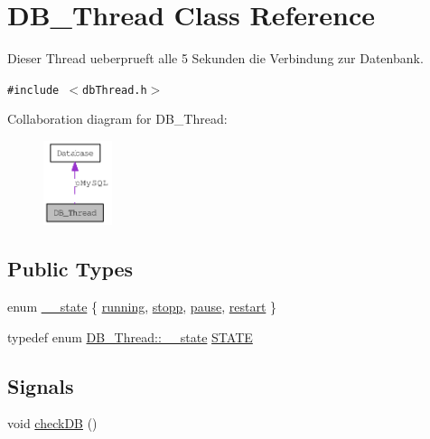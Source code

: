 \hypertarget{class_d_b___thread}{
\section{DB\_\-Thread Class Reference}
\label{class_d_b___thread}
}
Dieser Thread ueberprueft alle 5 Sekunden die Verbindung zur Datenbank.  


{\tt \#include $<$dbThread.h$>$}

Collaboration diagram for DB\_\-Thread:\nopagebreak
\begin{figure}[H]
\begin{center}
\leavevmode
\includegraphics[width=57pt]{class_d_b___thread__coll__graph}
\end{center}
\end{figure}
\subsection*{Public Types}
\begin{CompactItemize}
\item 
enum \hyperlink{class_d_b___thread_056b06b7057fe2d2c90640629908d067}{\_\-\_\-state} \{ \hyperlink{class_d_b___thread_056b06b7057fe2d2c90640629908d067e3fcc0be212969d602965ecffc92322a}{running}, 
\hyperlink{class_d_b___thread_056b06b7057fe2d2c90640629908d06783b156701d5c8cf522dbe2fef9a4f86c}{stopp}, 
\hyperlink{class_d_b___thread_056b06b7057fe2d2c90640629908d0671d6c307cea966b1131a430c477f063b9}{pause}, 
\hyperlink{class_d_b___thread_056b06b7057fe2d2c90640629908d06775836f6eb7ea02e6179915382269ccd9}{restart}
 \}
\item 
typedef enum \hyperlink{class_d_b___thread_056b06b7057fe2d2c90640629908d067}{DB\_\-Thread::\_\-\_\-state} \hyperlink{class_d_b___thread_a70b1b8bfaf0d6b88c1284b947234b5e}{STATE}
\end{CompactItemize}
\subsection*{Signals}
\begin{CompactItemize}
\item 
void \hyperlink{class_d_b___thread_4c701f484e76dda9fb89e6f0fadec67b}{checkDB} ()
\end{CompactItemize}
